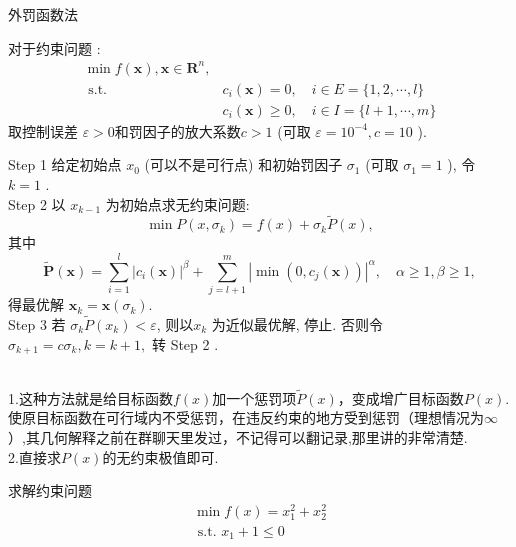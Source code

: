 \documentclass[cn]{elegantbook}
\begin{document}
\begin{algorithm}
\begin{center}
  \Large 外罚函数法
\end{center}
对于约束问题 :
$$
\begin{array}{ll}
\min f(\boldsymbol{x}), \boldsymbol{x} \in \mathbf{R}^{n}, & \\
\text { s.t. } & c_{i}(\boldsymbol{x})=0, \quad i \in E=\{1,2, \cdots, l\} \\
& c_{i}(\boldsymbol{x}) \geqslant 0, \quad i \in I=\{l+1, \cdots, m\}
\end{array}
$$
取控制误差 $ \varepsilon>0  $和罚因子的放大系数$  c>1 $ (可取  $\varepsilon=10^{-4}, c=10 $ ).

Step 1 给定初始点  $x_{0}$  (可以不是可行点) 和初始罚因子  $\sigma_{1} $ (可取  $\sigma_{1}=1 $ ), 令 $ k=1$ .\\
Step 2 以  $x_{k-1}$  为初始点求无约束问题:
$$
\min P\left(x, \sigma_{k}\right)=f(x)+\sigma_{k} \tilde{P}(x),
$$
其中 $$
\tilde{\boldsymbol{P}}(\boldsymbol{x})=\sum_{i=1}^{l}\left|c_{i}(\boldsymbol{x})\right|^{\beta}+\sum_{j=l+1}^{m}\left|\min \left(0, c_{j}(\boldsymbol{x})\right)\right|^{\alpha}, \quad\alpha \geqslant 1, \beta \geqslant 1,$$  得最优解  $\boldsymbol{x}_{k}=\boldsymbol{x}\left(\sigma_{k}\right) $.\\
Step 3 若 $ \sigma_{k} \tilde{P}\left(x_{k}\right)<\varepsilon $, 则以$  x_{k}$  为近似最优解, 停止. 否则令$  \sigma_{k+1}=c \sigma_{k}, k=k+1,$ 转 Step 2 .
\end{algorithm}
\begin{note}\\
1.这种方法就是给目标函数$f(x)$加一个惩罚项$ \tilde{P}(x)$，变成增广目标函数$P(x)$.使原目标函数在可行域内不受惩罚，在违反约束的地方受到惩罚（理想情况为$\infty$）,其几何解释之前在群聊天里发过，不记得可以翻记录,那里讲的非常清楚.\\
2.直接求$P(x)$的无约束极值即可.\\
\end{note}
\begin{exercisez}
求解约束问题$$
\begin{array}{l}
\min f(x)=x_{1}^{2}+x_{2}^{2} \\
\text { s.t. } x_{1}+1 \leq 0
\end{array}$$
\end{exercisez}
\end{document}
